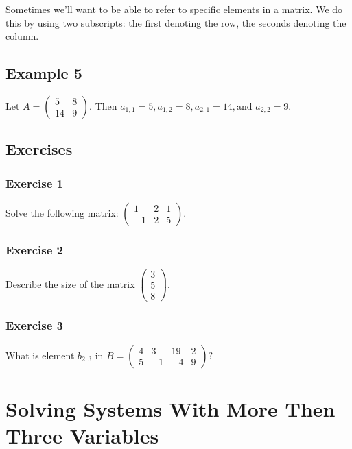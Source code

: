 \documentclass[a4paper,twoside,12pt]{memoir}  %
\begin{document}
Sometimes we'll want to be able to refer to specific elements in a matrix.
We do this by using two subscripts: the first denoting the row, the seconds denoting the column.
\subsection{Example 5}
Let $A = \begin{pmatrix} 5 & 8 \\ 14 & 9 \end{pmatrix}$.
Then $a_{1,1} = 5, a_{1,2} = 8, a_{2,1} = 14, \textrm{and } a_{2,2} = 9$.

\subsection{Exercises}
\subsubsection{Exercise 1}
Solve the following matrix: $\begin{pmatrix} 1 & 2 & 1 \\ -1 & 2 & 5\end{pmatrix}$. %

\subsubsection{Exercise 2}
Describe the size of the matrix $\begin{pmatrix} 3 \\ 5 \\ 8 \end{pmatrix}$.

\subsubsection{Exercise 3}
What is element $b_{2,3}$ in $B = \begin{pmatrix}4 & 3 & 19 & 2 \\ 5 & -1 & -4 & 9\end{pmatrix}?$



\section{Solving Systems With More Then Three Variables}
\end{document}
